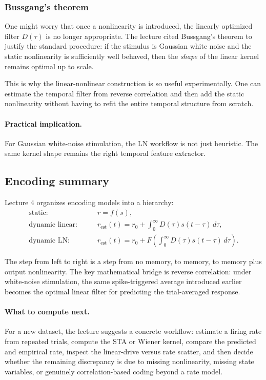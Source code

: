 \subsubsection{Bussgang's theorem}

One might worry that once a nonlinearity is introduced, the linearly optimized filter $D(\tau)$ is no longer appropriate. The lecture cited Bussgang's theorem to justify the standard procedure: if the stimulus is Gaussian white noise and the static nonlinearity is sufficiently well behaved, then the \emph{shape} of the linear kernel remains optimal up to scale.

This is why the linear-nonlinear construction is so useful experimentally. One can estimate the temporal filter from reverse correlation and then add the static nonlinearity without having to refit the entire temporal structure from scratch.

\paragraph{Practical implication.}
For Gaussian white-noise stimulation, the LN workflow is not just heuristic. The same kernel shape remains the right temporal feature extractor.

\subsection{Encoding summary}

Lecture 4 organizes encoding models into a hierarchy:
\begin{align*}
\text{static:} \qquad & r = f(s),\\
\text{dynamic linear:} \qquad & r_{\mathrm{est}}(t)=r_0+\int_0^{\infty} D(\tau)s(t-\tau)\,d\tau,\\
\text{dynamic LN:} \qquad & r_{\mathrm{est}}(t)=r_0+F\!\left(\int_0^{\infty} D(\tau)s(t-\tau)\,d\tau\right).
\end{align*}

The step from left to right is a step from no memory, to memory, to memory plus output nonlinearity. The key mathematical bridge is reverse correlation: under white-noise stimulation, the same spike-triggered average introduced earlier becomes the optimal linear filter for predicting the trial-averaged response.

\paragraph{What to compute next.}
For a new dataset, the lecture suggests a concrete workflow: estimate a firing rate from repeated trials, compute the STA or Wiener kernel, compare the predicted and empirical rate, inspect the linear-drive versus rate scatter, and then decide whether the remaining discrepancy is due to missing nonlinearity, missing state variables, or genuinely correlation-based coding beyond a rate model.
